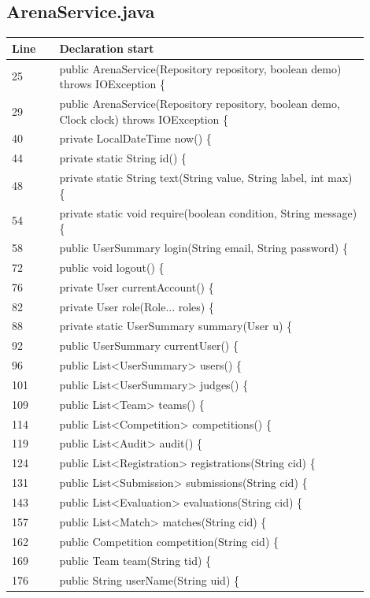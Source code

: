 \subsection*{ArenaService.java}
\begin{longtable}{p{0.12\linewidth}p{0.78\linewidth}}\toprule Line & Declaration start\\\midrule\endhead
25 & public ArenaService(Repository repository, boolean demo) throws IOException \{\\
29 & public ArenaService(Repository repository, boolean demo, Clock clock) throws IOException \{\\
40 & private LocalDateTime now() \{\\
44 & private static String id() \{\\
48 & private static String text(String value, String label, int max) \{\\
54 & private static void require(boolean condition, String message) \{\\
58 & public UserSummary login(String email, String password) \{\\
72 & public void logout() \{\\
76 & private User currentAccount() \{\\
82 & private User role(Role... roles) \{\\
88 & private static UserSummary summary(User u) \{\\
92 & public UserSummary currentUser() \{\\
96 & public List<UserSummary> users() \{\\
101 & public List<UserSummary> judges() \{\\
109 & public List<Team> teams() \{\\
114 & public List<Competition> competitions() \{\\
119 & public List<Audit> audit() \{\\
124 & public List<Registration> registrations(String cid) \{\\
131 & public List<Submission> submissions(String cid) \{\\
143 & public List<Evaluation> evaluations(String cid) \{\\
157 & public List<Match> matches(String cid) \{\\
162 & public Competition competition(String cid) \{\\
169 & public Team team(String tid) \{\\
176 & public String userName(String uid) \{\\

\end{longtable}
